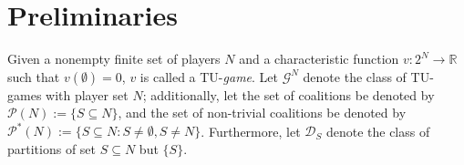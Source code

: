 \documentclass[a4paper,12pt]{article}
\theoremstyle{definition}
\theoremstyle{remark}
\begin{document}

\section{Preliminaries}\label{sec:Pre}


Given a nonempty finite set of players $N$ and a characteristic function $v \colon 2^{N} \to \mathbb{R}$ such that $v(\emptyset )=0$, $v$ is called a TU-\emph{game}. Let $\mathcal{G}^N$ denote the class of TU-games with player set $N$; additionally, let the set of coalitions be denoted by $\mathcal{P}(N) := \{ S\subseteq N \} $, and the set of non-trivial coalitions be denoted by $\mathcal{P}^*(N):=\{ S\subseteq N\colon S\neq \emptyset , S\neq N\}$. Furthermore, let $\mathcal{D}_S$ denote the class of partitions of set $S\subseteq N$ but $\{ S\}$.%

\end{document}
